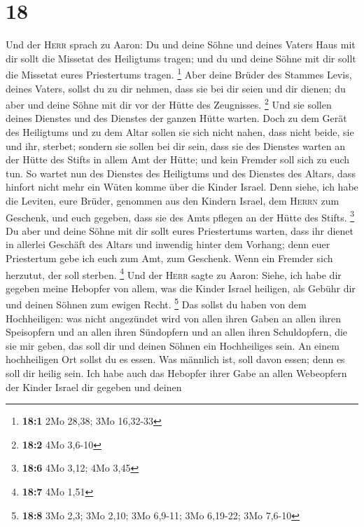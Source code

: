 \hypertarget{section-3}{%
\section{18}\label{section-3}}

 Und der \textsc{Herr} sprach zu Aaron: Du und deine Söhne
und deines Vaters Haus mit dir sollt die Missetat des Heiligtums tragen;
und du und deine Söhne mit dir sollt die Missetat eures Priestertums
tragen. \footnote{\textbf{18:1} 2Mo 28,38; 3Mo 16,32-33} 
Aber deine Brüder des Stammes Levis, deines Vaters, sollst du zu dir
nehmen, dass sie bei dir seien und dir dienen; du aber und deine Söhne
mit dir vor der Hütte des Zeugnisses. \footnote{\textbf{18:2} 4Mo 3,6-10}
 Und sie sollen deines Dienstes und des Dienstes der
ganzen Hütte warten. Doch zu dem Gerät des Heiligtums und zu dem Altar
sollen sie sich nicht nahen, dass nicht beide, sie und ihr, sterbet;
 sondern sie sollen bei dir sein, dass sie des Dienstes
warten an der Hütte des Stifts in allem Amt der Hütte; und kein Fremder
soll sich zu euch tun.  So wartet nun des Dienstes des
Heiligtums und des Dienstes des Altars, dass hinfort nicht mehr ein
Wüten komme über die Kinder Israel.  Denn siehe, ich habe
die Leviten, eure Brüder, genommen aus den Kindern Israel, dem
\textsc{Herrn} zum Geschenk, und euch gegeben, dass sie des Amts pflegen
an der Hütte des Stifts. \footnote{\textbf{18:6} 4Mo 3,12; 4Mo 3,45}
 Du aber und deine Söhne mit dir sollt eures Priestertums
warten, dass ihr dienet in allerlei Geschäft des Altars und inwendig
hinter dem Vorhang; denn euer Priestertum gebe ich euch zum Amt, zum
Geschenk. Wenn ein Fremder sich herzutut, der soll sterben. \footnote{\textbf{18:7}
  4Mo 1,51}  Und der \textsc{Herr} sagte zu Aaron: Siehe,
ich habe dir gegeben meine Hebopfer von allem, was die Kinder Israel
heiligen, als Gebühr dir und deinen Söhnen zum ewigen Recht. \footnote{\textbf{18:8}
  3Mo 2,3; 3Mo 2,10; 3Mo 6,9-11; 3Mo 6,19-22; 3Mo 7,6-10} 
Das sollst du haben von dem Hochheiligen: was nicht angezündet wird von
allen ihren Gaben an allen ihren Speisopfern und an allen ihren
Sündopfern und an allen ihren Schuldopfern, die sie mir geben, das soll
dir und deinen Söhnen ein Hochheiliges sein.  An einem
hochheiligen Ort sollst du es essen. Was männlich ist, soll davon essen;
denn es soll dir heilig sein.  Ich habe auch das Hebopfer
ihrer Gabe an allen Webeopfern der Kinder Israel dir gegeben und deinen
